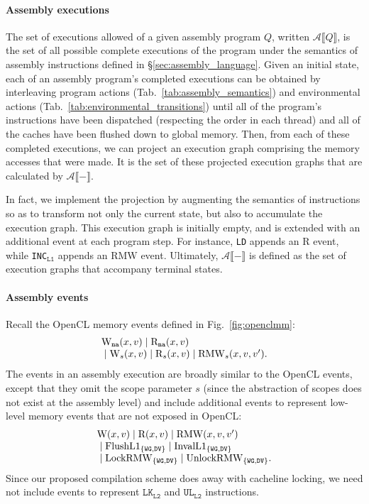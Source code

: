\documentclass[svgnames,10pt]{sigplanconf}
\makeatletter
\theoremstyle{definition}
\newcommand\mstack[2][l]{{\renewcommand\arraystretch{1}\begin{array}{@{}#1@{}}#2\end{array}}}
\newcommand\sem[1]{\llbracket #1 \rrbracket}
\newcommand\Lsem[1]{\mathcal{A}\sem{#1}}
\newcommand\na{{\tt na}}
\newcommand\swg{{\tt WG}}
\newcommand\sdv{{\tt DV}}
\newcommand\INSld{\texttt{LD}}
\newcommand\INSincl[1]{\texttt{INC$_{\texttt{L#1}}$}}
\newcommand\INSlk[1]{\texttt{LK$_{\texttt{#1}}$}}
\newcommand\INSul[1]{\texttt{UL$_{\texttt{#1}}$}}
\newcommand\evW{{\rm W}}
\newcommand\evR{{\rm R}}
\newcommand\evWna{{\rm W}_{\na}}
\newcommand\evRna{{\rm R}_{\na}}
\newcommand\evRMW{{\rm RMW}}
\makeatother
\begin{document}
\paragraph{Assembly executions} The set of executions allowed of a
given assembly program $Q$, written $\Lsem{Q}$, is the set of
all possible complete executions of the program under the
semantics of assembly instructions defined in
\S\ref{sec:assembly_language}. 
%
Given an initial state, each of an assembly program's completed executions
can be obtained by interleaving program actions
(Tab.~\ref{tab:assembly_semantics}) and environmental actions
(Tab.~\ref{tab:environmental_transitions}) until all of the program's
instructions have been dispatched (respecting the order in each
thread) and all of the caches have been flushed down to global memory.
%
Then, from each of these completed executions, we can project an
execution graph comprising the memory accesses that were made.
It is the set of these projected execution graphs that are
calculated by $\Lsem{-}$.

In fact, we implement the projection by augmenting the semantics of
instructions so as to transform not only the current state, but also
to accumulate the execution graph. This execution graph is initially
empty, and is extended with an additional event at each
program step. For instance, \INSld{} appends an $\mathrm{R}$ event,
while \INSincl1 appends an $\mathrm{RMW}$ event. Ultimately,
$\Lsem{-}$ is defined as the set of execution graphs that accompany
terminal states.

\paragraph{Assembly events}
Recall the OpenCL memory events defined in Fig.~\ref{fig:openclmm}:
\begin{equation}
\label{eq:opencl_events}
\mstack{\evWna(x,v) \mid \evRna(x,v) {}\\{} \mid \evW_s(x,v) \mid \evR_s(x,v) \mid \evRMW_s(x,v,v').}
\end{equation}
The events in an assembly execution are broadly similar to the OpenCL events, except that they omit the scope parameter $s$ (since the abstraction of
scopes does not exist at the assembly level) and include additional
events to represent low-level memory events that are not exposed
in OpenCL:
\begin{equation}
\label{eq:asm_events}
\mstack{\mathrm{W}(x,v) \mid \mathrm{R}(x,v) \mid \mathrm{RMW}(x,v,v')
{}\\{} \mid
\mathrm{FlushL1}_{\{\swg,\sdv\}} \mid
\mathrm{InvalL1}_{\{\swg,\sdv\}} {}\\{} \mid \mathrm{LockRMW}_{\{\swg,\sdv\}}
\mid \mathrm{UnlockRMW}_{\{\swg,\sdv\}}.}
\end{equation}
Since our proposed compilation scheme does away with cacheline
locking, we need not include events to represent $\INSlk{L2}$ and
$\INSul{L2}$ instructions.
\end{document}
